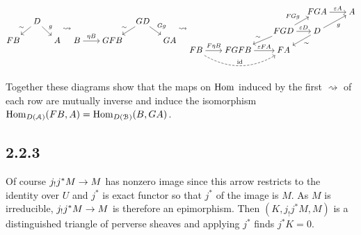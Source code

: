 \documentclass[deligne.tex]{subfiles}
\begin{document}
{\small\begin{ceqn}\begin{equation*}
\begin{tikzcd}[cramped,column sep=10pt,row sep=10pt]
	&D\arrow[dl,"\sim"']\arrow[dr,"g"] \\
	FB&&A
\end{tikzcd}
\rightsquigarrow
\begin{tikzcd}[cramped,column sep=10pt,row sep=10pt]
	&[10pt]&GD\arrow[dl,"\sim"']\arrow[dr,"Gg"] \\
	B\arrow[r,"\eta B"]&GFB&&GA
\end{tikzcd}
\rightsquigarrow
\begin{tikzcd}[cramped,column sep=10pt,row sep=10pt]
	&[10pt]&[10pt]&FGA\arrow[r,"\vep A"]&[10pt]A \\
	&&FGD\arrow[dl,"\sim"']\arrow[r,"\vep D"]\arrow[ur,"FGg"]
	&D\arrow[dl,"\sim"]\arrow[ur,"g"'] \\
	FB\arrow[rr,bend right,dashed,"\id"]\arrow[r,"F\eta B"]
	&FGFB\arrow[r,"\vep FA"]&FA
\end{tikzcd}
\end{equation*}\end{ceqn}}
Together these diagrams show that the maps on $\operatorname{Hom}$ induced by the first
$\rightsquigarrow$ of each row are mutually inverse and induce the 
isomorphism $\operatorname{Hom}_{D(\mathcal A)}(FB,A)=\operatorname{Hom}_{D(\mathcal B)}(B,GA)$.

\subsection*{2.2.3}
Of course $j_!j^*M\rightarrow M$ has nonzero image since this arrow 
restricts to the identity over $U$ and $j^*$ is exact functor so that $j^*$
of the image is $M$. As $M$ is irreducible, $j_!j^*M\rightarrow M$ is therefore an
epimorphism. Then $(K,j_!j^*M,M)$ is a distinguished triangle of perverse
sheaves and applying $j^*$ finds $j^*K=0$.
\end{document}
